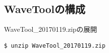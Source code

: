 \documentclass{jsarticle}
\begin{document}

\subsection{WaveToolの構成}

WaveTool\_20170119.zipの展開\\
\begin{Verbatim}[frame=single]
$ unzip WaveTool_20170119.zip
\end{Verbatim}
\end{document}
